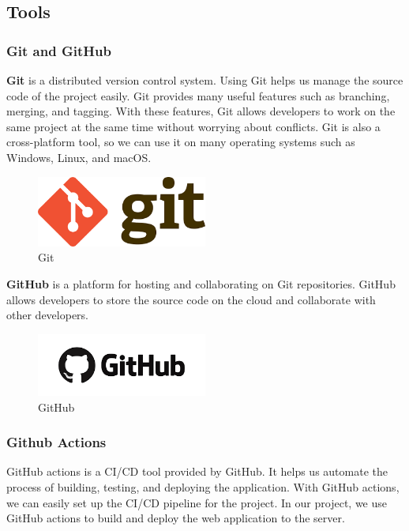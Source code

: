 \subsection{Tools}

\subsubsection{Git and GitHub}
\textbf{Git} is a distributed version control system. Using Git helps us manage the source code of the project easily. Git provides many useful features such as branching, merging, and tagging. With these features, Git allows developers to work on the same project at the same time without worrying about conflicts. Git is also a cross-platform tool, so we can use it on many operating systems such as Windows, Linux, and macOS.

\begin{figure}[ht]
    \centering
    \includegraphics[width=0.5\textwidth]{../Images/8.Technology_Stack/git_logo.png}
    \caption{Git}
    \label{fig:git}
\end{figure}

\noindent \textbf{GitHub} is a platform for hosting and collaborating on Git repositories. GitHub allows developers to store the source code on the cloud and collaborate with other developers.

\begin{figure}
    \centering
    \includegraphics[width=0.5\textwidth]{../Images/8.Technology_Stack/github_logo.png}
    \caption{GitHub}
    \label{fig:github}
\end{figure}

\subsubsection{Github Actions}
GitHub actions is a CI/CD tool provided by GitHub. It helps us automate the process of building, testing, and deploying the application. With GitHub actions, we can easily set up the CI/CD pipeline for the project. In our project, we use GitHub actions to build and deploy the web application to the server.

